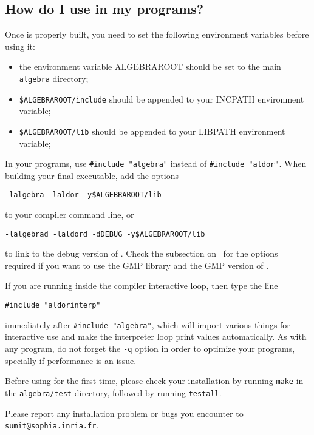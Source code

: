 \subsection*{How do I use \stdmath in my programs?}
Once \stdmath is properly built, you need to set the following environment
variables before using it:
\begin{itemize}
\item the environment variable ALGEBRAROOT should be set to
the main {\tt algebra} directory;
\item {\tt \$ALGEBRAROOT/include}
should be appended to your INCPATH environment variable;
\item {\tt \$ALGEBRAROOT/lib}
should be appended to your LIBPATH environment variable;
\end{itemize}
In your \aldor programs, use {\tt \#include "algebra"} instead of
{\tt \#include "aldor"}.
When building your final executable, add the options
\begin{center}
{\tt -lalgebra -laldor -y\$ALGEBRAROOT/lib}
\end{center}
to your compiler command line, or
\begin{center}
{\tt -lalgebrad -laldord -dDEBUG -y\$ALGEBRAROOT/lib}
\end{center}
to link to the debug version of \libalgebra.
Check the subsection on~
for the options required if you want to use the GMP library and the GMP
version of \libalgebra.

If you are running \stdmath inside the compiler interactive loop, then
type the line
\begin{center}
{\tt \#include "aldorinterp"}
\end{center}
immediately after {\tt \#include "algebra"},
which will import various things for interactive use and make the interpreter
loop print values automatically.
As with any \aldor program, do not forget
the {\tt -q} option in order to optimize your programs, specially
if performance is an issue.

Before using \stdmath for the first time, please check your installation
by running {\tt make} in the {\tt algebra/test} directory, followed by
running {\tt testall}.

Please report any installation problem or bugs you encounter
to {\tt sumit@sophia.inria.fr}.
